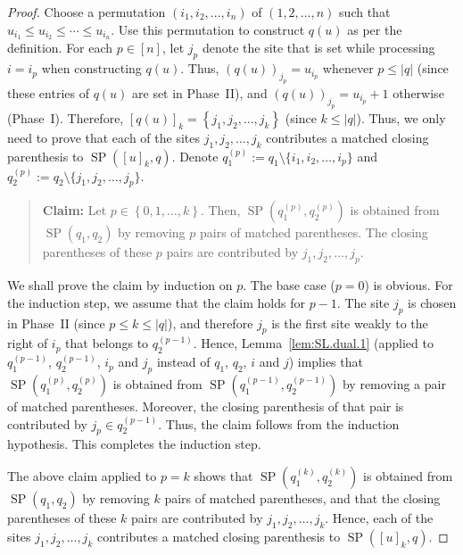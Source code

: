 \documentclass[reqno]{amsart}
\newcommand{\0}{\phantom{c}}
\newenvironment{statement}{\begin{quote}}{\end{quote}}
\newcommand{\SP}{\operatorname{SP}}
\newcommand{\set}[1]{\left\{ #1 \right\}}
\newcommand{\abs}[1]{\left| #1 \right|}
\newcommand{\ive}[1]{\left[ #1 \right]}
\theoremstyle{plain}
\theoremstyle{definition}
\numberwithin{equation}{section}
\begin{document}
\begin{proof}
Choose a permutation $(i_1, i_2, \dotsc, i_n)$ of $(1, 2, \dotsc, n)$ such that $u_{i_1} \leq u_{i_2} \leq \cdots \leq u_{i_n}$.
Use this permutation to construct $q(u)$ as per the definition.
For each $p \in \ive{n}$, let $j_p$ denote the site that is set while processing $i = i_p$ when constructing $q(u)$.
Thus, $(q(u))_{j_p} = u_{i_p}$ whenever $p \leq \abs{q}$ (since these entries of $q(u)$ are set in Phase~II),
and $(q(u))_{j_p} = u_{i_p} + 1$ otherwise (Phase~I).
Therefore, $\ive{q(u)}_k = \set{j_1, j_2, \ldots, j_k}$ (since $k \leq \abs{q}$).
Thus, we only need to prove that each of the sites $j_1, j_2, \ldots, j_k$ contributes a matched closing parenthesis to $\SP(\ive{u}_k, q)$.
Denote $q_1^{(p)} := q_1 \setminus \{i_1, i_2, \dotsc, i_p\}$ and $q_2^{(p)} := q_2 \setminus \{j_1, j_2, \dotsc, j_p\}$.

\medskip

\begin{statement}
\textbf{Claim:}
Let $p \in \set{0, 1, \ldots, k}$.
Then, $\SP(q_1^{(p)}, q_2^{(p)})$ is obtained from $\SP(q_1 , q_2)$ by removing $p$ pairs of matched parentheses.
The closing parentheses of these $p$ pairs are contributed by $j_1, j_2, \ldots, j_p$.
\end{statement}

\medskip

We shall prove the claim by induction on $p$.
The base case ($p = 0$) is obvious.
For the induction step, we assume that the claim holds for $p-1$.
The site $j_p$ is chosen in Phase~II (since $p \leq k \leq \abs{q}$), and therefore $j_p$ is the first site weakly to the right of $i_p$ that belongs to $q_2^{(p-1)}$.
Hence, Lemma~\ref{lem:SL.dual.1}
(applied to $q_1^{(p-1)}$, $q_2^{(p-1)}$, $i_p$ and $j_p$ instead of $q_1$, $q_2$, $i$ and $j$)
implies that $\SP(q_1^{(p)}, q_2^{(p)})$ is obtained from $\SP(q_1^{(p-1)}, q_2^{(p-1)})$ by removing a pair of matched parentheses.
Moreover, the closing parenthesis of that pair is contributed by $j_p \in q_2^{(p-1)}$.
Thus, the claim follows from the induction hypothesis.
This completes the induction step.

\medskip

The above claim applied to $p = k$ shows that $\SP(q_1^{(k)}, q_2^{(k)})$ is obtained from $\SP(q_1 , q_2)$ by removing $k$ pairs of matched parentheses, and that the closing parentheses of these $k$ pairs are contributed by $j_1, j_2, \ldots, j_k$.
Hence, each of the sites $j_1, j_2, \ldots, j_k$ contributes a matched closing parenthesis to $\SP(\ive{u}_k, q)$.
\end{proof}
\end{document}
